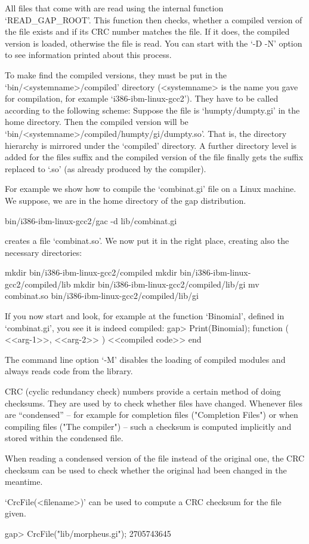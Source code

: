 All files that come with {\GAP} are read using the internal function
`READ_GAP_ROOT'. This function then checks, whether a compiled version of the
file exists and if its CRC number matches the file. If it does, the compiled
version is loaded, otherwise the file is read.
You can start {\GAP} with the `-D -N' option to see information printed
about this process.

To make {\GAP} find the compiled versions, they must be
put in the `bin/<systemname>/compiled' directory (<systemname> is the name
you gave for compilation, for example `i386-ibm-linux-gcc2'). They have
to be called according to the following scheme: 
Suppose the file is `humpty/dumpty.gi' in the {\GAP} home
directory. Then the compiled version will be
`bin/<systemname>/compiled/humpty/gi/dumpty.so'. That is, the directory
hierarchy is mirrored under the `compiled' directory. A further directory
level is added for the files suffix and the compiled version of the file
finally gets the suffix replaced to `.so' (as already produced by the
compiler).

For example we show how
to compile the `combinat.gi' file on a Linux machine. We suppose, we are in
the home directory of the gap distribution.

\begintt
bin/i386-ibm-linux-gcc2/gac -d lib/combinat.gi
\endtt

creates a file `combinat.so'. We now put it in the right place, creating
also the necessary directories:

\begintt
mkdir bin/i386-ibm-linux-gcc2/compiled
mkdir bin/i386-ibm-linux-gcc2/compiled/lib
mkdir bin/i386-ibm-linux-gcc2/compiled/lib/gi
mv combinat.so bin/i386-ibm-linux-gcc2/compiled/lib/gi
\endtt

If you now start {\GAP} and look, for example at the function `Binomial',
defined in `combinat.gi', you see it is indeed compiled:
\begintt
gap> Print(Binomial);
function ( <<arg-1>>, <<arg-2>> )
    <<compiled code>>
end
\endtt

The command line option `-M'  disables the loading of compiled modules and
always reads code from the library.


CRC (cyclic redundancy check) numbers provide a certain method of doing
checksums. They are used by {\GAP} to check whether
files have changed.
Whenever files are ``condensed'' -- for example for completion files
("Completion Files") or when compiling files ("The compiler") -- such a
checksum is computed implicitly and stored within the condensed file.

When reading a condensed version of the file instead of the original one,
the CRC checksum can be used to check whether the original had been changed
in the meantime.

`CrcFile(<filename>)' can be used to compute a CRC checksum for the file
given.

\begintt
gap> CrcFile("lib/morpheus.gi");
2705743645
\endtt

